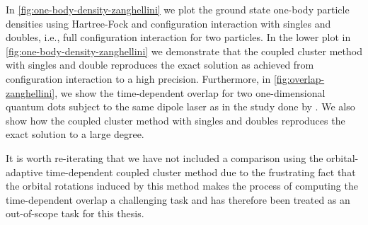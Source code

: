             In \autoref{fig:one-body-density-zanghellini} we plot the ground
            state one-body particle densities using Hartree-Fock and
            configuration interaction with singles and doubles, i.e., full
            configuration interaction for two particles.
            In the lower plot in \autoref{fig:one-body-density-zanghellini} we
            demonstrate that the coupled cluster method with singles and double
            reproduces the exact solution as achieved from configuration
            interaction to a high precision.
            Furthermore, in \autoref{fig:overlap-zanghellini}, we show the
            time-dependent overlap for two one-dimensional quantum dots subject
            to the same dipole laser as in the study done by
            \citeauthor{zanghellini_2004} \cite{zanghellini_2004}.
            We also show how the coupled cluster method with singles and doubles
            reproduces the exact solution to a large degree.

            It is worth re-iterating that we have not included a comparison
            using the orbital-adaptive time-dependent coupled cluster method due
            to the frustrating fact that the orbital rotations induced by this
            method makes the process of computing the time-dependent overlap a
            challenging task and has therefore been treated as an out-of-scope
            task for this thesis.

